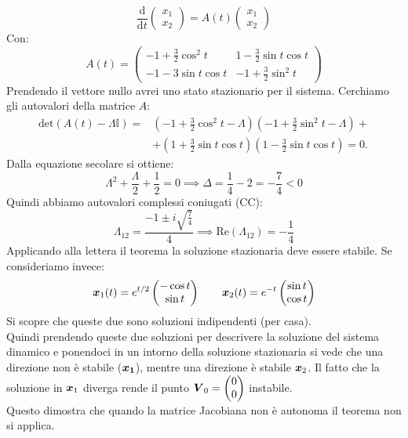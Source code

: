 \begin{exmp}
    \[
	\frac{\text{d} }{\text{d} t} \begin{pmatrix} x_1 \\ x_2 \end{pmatrix} = A(t)\begin{pmatrix} x_1 \\ x_2 \end{pmatrix} 
    \] 
    Con:
    \[
	A(t) = 
	\begin{pmatrix} 
	    -1 + \frac{3}{2}\cos^2t & 1- \frac{3}{2}\sin t\cos t \\
	    -1 -3\sin t \cos t & -1 + \frac{3}{2}\sin^2t
	\end{pmatrix} 
    \] 
    Prendendo il vettore nullo avrei uno stato stazionario per il sistema. Cerchiamo gli autovalori della matrice $A$:
    \[\begin{aligned}
	\text{det}(A(t)- \Lambda  \mathbb{I}) =& (-1 + \frac{3}{2}\cos^2t - \Lambda)(-1+\frac{3}{2}\sin^2t -\Lambda)+\\
					       &+(1+\frac{3}{2}\sin t\cos t)(1-\frac{3}{2}\sin t\cos t)=0
    .\end{aligned}\]
    Dalla equazione secolare si ottiene:
    \[
        \Lambda^2 + \frac{\Lambda}{2}+\frac{1}{2}=0 \implies  \Delta  = \frac{1}{4}-2 = -\frac{7}{4} <0
    \] 
    Quindi abbiamo autovalori complessi coniugati (CC):
    \[
	\Lambda_{12} = \frac{-1 \pm i \sqrt{\frac{7}{4}}}{4} \implies  \text{Re}(\Lambda_{12})=-\frac{1}{4}
    \] 
    Applicando alla lettera il teorema la soluzione stazionaria deve essere stabile. Se consideriamo invece:
    \[
	\boldsymbol{x}_1(t)=e^{t /2}\begin{pmatrix} -\cos t \\ \sin t \end{pmatrix}  \qquad \boldsymbol{x}_2(t)=e^{-t}\begin{pmatrix} \sin t \\ \cos t \end{pmatrix} 
    \] 
    Si scopre che queste due sono soluzioni indipendenti (per casa). \\
    Quindi prendendo queste due soluzioni per descrivere la soluzione del sistema dinamico e ponendoci in un intorno della soluzione stazionaria si vede che una direzione non è stabile ($\boldsymbol{x_1}$), mentre una direzione è stabile $\boldsymbol{x}_2$. Il fatto che la soluzione in $\boldsymbol{x}_1$ diverga rende il punto $\boldsymbol{V}_0 = \begin{pmatrix} 0\\ 0 \end{pmatrix} $ instabile. \\
   Questo dimostra che quando la matrice Jacobiana non è autonoma il teorema non si applica.
\end{exmp}

